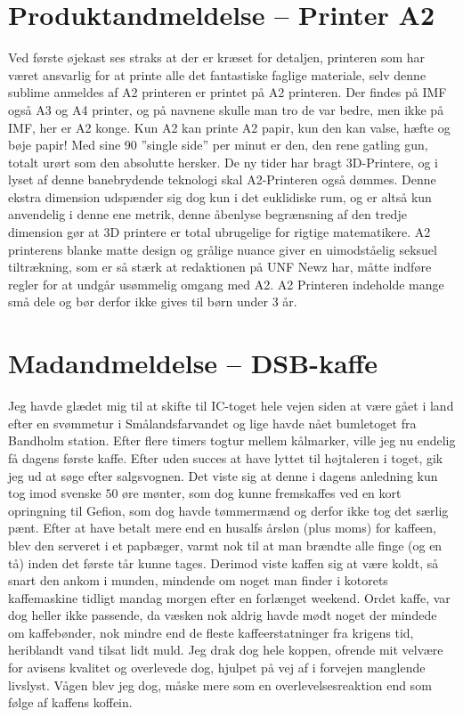 \begin{minipage}[t]{100mm}
\vspace{1mm}
\section*{Produktandmeldelse -- Printer A2}
Ved første øjekast ses straks at der er kræset for detaljen, printeren som har været ansvarlig for at printe alle det fantastiske faglige materiale, selv denne sublime anmeldes af A2 printeren er printet på A2 printeren.  Der findes på IMF også A3 og A4 printer, og på navnene skulle man tro de var bedre, men ikke på IMF, her er A2 konge. Kun A2 kan printe A2 papir, kun den kan valse, hæfte og bøje papir! Med sine 90 ”single side” per minut er den, den rene gatling gun, totalt urørt som den absolutte hersker. De ny tider har bragt 3D-Printere, og i lyset af denne banebrydende teknologi skal A2-Printeren også dømmes. Denne ekstra dimension udspænder sig dog kun i det euklidiske rum, og er altså kun anvendelig i denne ene metrik, denne åbenlyse begrænsning af den tredje dimension gør at 3D printere er total ubrugelige for rigtige matematikere.  A2 printerens blanke matte design og grålige nuance giver en uimodståelig seksuel tiltrækning, som er så stærk at redaktionen på UNF Newz har, måtte indføre regler for at undgår usømmelig omgang med A2. 
A2 Printeren indeholde mange små dele og bør derfor ikke gives til børn under 3 år.

\vspace{1mm}
\section*{Madandmeldelse -- DSB-kaffe}
\vspace{2mm}

Jeg havde glædet mig til at skifte til IC-toget hele vejen siden at være gået i land efter en svømmetur i Smålandsfarvandet og lige havde nået bumletoget fra Bandholm station. Efter flere timers togtur mellem kålmarker, ville jeg nu endelig få dagens første kaffe. Efter uden succes at have lyttet til højtaleren i toget, gik jeg ud at søge efter salgsvognen. Det viste sig at denne i dagens anledning kun tog imod svenske $50$ øre mønter, som dog kunne fremskaffes ved en kort opringning til Gefion, som dog havde tømmermænd og derfor ikke tog det særlig pænt. Efter at have betalt mere end en husalfs årsløn (plus moms) for kaffeen, blev den serveret i et papbæger, varmt nok til at man brændte alle finge (og en tå) inden det første tår kunne tages. Derimod viste kaffen sig at være koldt, så snart den ankom i munden, mindende om noget man finder i kotorets kaffemaskine tidligt mandag morgen efter en forlænget weekend. Ordet kaffe, var dog heller ikke passende, da væsken nok aldrig havde mødt noget der mindede om kaffebønder, nok mindre end de fleste kaffeerstatninger fra krigens tid, heriblandt vand tilsat lidt muld. Jeg drak dog hele koppen, ofrende mit velvære for avisens kvalitet og overlevede dog, hjulpet på vej af i forvejen manglende livslyst. Vågen blev jeg dog, måske mere som en overlevelsesreaktion end som følge af kaffens koffein.


\end{minipage}

